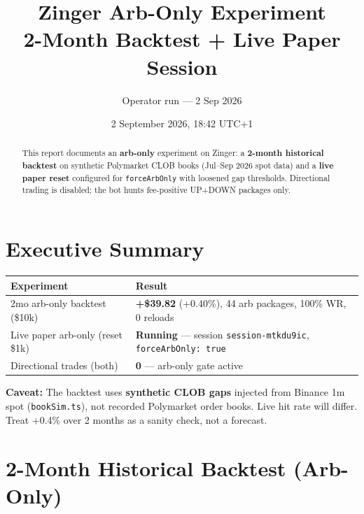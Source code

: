 \documentclass[11pt,a4paper]{article}
\title{\textbf{Zinger Arb-Only Experiment}\\[0.4em]
\large 2-Month Backtest + Live Paper Session}
\author{Operator run --- 2 Sep 2026}
\date{2 September 2026, 18:42 UTC+1}
\begin{document}
\maketitle
\thispagestyle{empty}

\begin{abstract}
\noindent
This report documents an \textbf{arb-only} experiment on Zinger: a \textbf{2-month historical backtest} on synthetic Polymarket CLOB books (Jul--Sep 2026 spot data) and a \textbf{live paper reset} configured for \texttt{forceArbOnly} with loosened gap thresholds. Directional trading is disabled; the bot hunts fee-positive UP+DOWN packages only.
\end{abstract}

\tableofcontents
\newpage

\section{Executive Summary}

\begin{table}[h]
\centering
\begin{tabular}{@{}ll@{}}
\toprule
\textbf{Experiment} & \textbf{Result} \\
\midrule
2mo arb-only backtest (\$10k) & \textbf{+\$39.82} (+0.40\%), 44 arb packages, 100\% WR, 0 reloads \\
Live paper arb-only (reset \$1k) & \textbf{Running} --- session \texttt{session-mtkdu9ic}, \texttt{forceArbOnly: true} \\
Directional trades (both) & \textbf{0} --- arb-only gate active \\
\bottomrule
\end{tabular}
\end{table}

\noindent\textbf{Caveat:} The backtest uses \textbf{synthetic CLOB gaps} injected from Binance 1m spot (\texttt{bookSim.ts}), not recorded Polymarket order books. Live hit rate will differ. Treat +0.4\% over 2 months as a sanity check, not a forecast.

\section{2-Month Historical Backtest (Arb-Only)}
\end{document}
